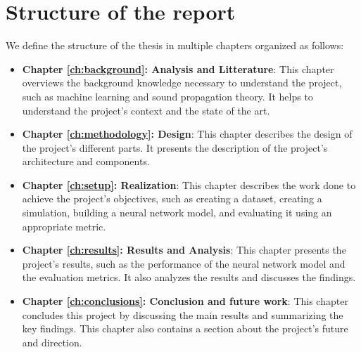 \section{Structure of the report}
\label{intro:structure}

We define the structure of the thesis in multiple chapters organized as follows:

\begin{itemize}
    \item \textbf{Chapter \ref{ch:background}: Analysis and Litterature}: This chapter overviews the background knowledge necessary to understand the project, such as machine learning and sound propagation theory. It helps to understand the project's context and the state of the art.
    \item \textbf{Chapter \ref{ch:methodology}: Design}: This chapter describes the design of the project's different parts. It presents the description of the project's architecture and components.
    \item \textbf{Chapter \ref{ch:setup}: Realization}: This chapter describes the work done to achieve the project's objectives, such as creating a dataset, creating a simulation, building a neural network model, and evaluating it using an appropriate metric.
    \item \textbf{Chapter \ref{ch:results}: Results and Analysis}: This chapter presents the project's results, such as the performance of the neural network model and the evaluation metrics. It also analyzes the results and discusses the findings.
    \item \textbf{Chapter \ref{ch:conclusions}: Conclusion and future work}: This chapter concludes this project by discussing the main results and summarizing the key findings. This chapter also contains a section about the project's future and direction.
\end{itemize}

